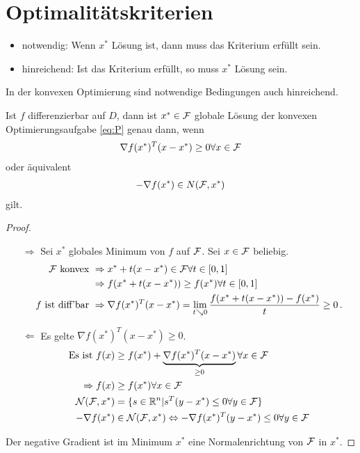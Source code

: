 \section*{Optimalitätskriterien}
\begin{itemize}
\item notwendig: Wenn $x^*$ Lösung ist, dann muss das Kriterium erfüllt sein.
\item hinreichend: Ist das Kriterium erfüllt, so muss $x^*$ Lösung sein.
\end{itemize}
In der konvexen Optimierung sind notwendige Bedingungen auch hinreichend.
\begin{Satz}
\label{opt1}
Ist $f$ differenzierbar auf $D$, dann ist $x^* \in \mathcal{F}$ globale Lösung der konvexen Optimierungsaufgabe \eqref{eq:P} genau dann, wenn
\begin{align*}
\nabla f(x^*)^T(x - x^*) \geq 0  \forall x \in \mathcal{F}
\end{align*}
oder äquivalent
\begin{align*}
-\nabla f(x^*) \in N(\mathcal{F}, x^*)
\end{align*}
gilt.
\end{Satz}
\begin{proof}
\begin{itemize}
\item[$\Rightarrow$] Sei $x^*$ globales Minimum von $f$ auf $\mathcal{F}$. Sei $x\in \mathcal{F}$ beliebig.
\begin{align*}
\mathcal{F} \text{ konvex } &\Rightarrow x^*+t(x-x^*) \in \mathcal{F} \forall t \in [0,1]\\
&\Rightarrow f(x^*+t(x-x^*)) \geq f(x^*) \forall t \in [0,1] \\
f \text{ ist diff'bar } &\Rightarrow \nabla f(x^*)^T(x-x^*)=\lim_{t\searrow 0}\frac{f(x^*+t(x-x^*))-f(x^*)}{t} \geq 0\,.
\end{align*}
\item[$\Leftarrow$] Es gelte $\nabla f(x^*)^T(x - x^*) \geq 0$.
\begin{align*}
\text{Es ist } f(x) &\geq f(x^*)+\underbrace{\nabla f(x^*)^T(x-x^*)}_{\geq 0} \forall x \in \mathcal{F} \\
\Rightarrow f(x) &\geq f(x^*)  \forall x\in \mathcal{F} \\
\mathcal{N}(\mathcal{F}, x^*)&=\lbrace s\in\mathbb R^n | s^T(y-x^*)\leq 0 \forall y\in\mathcal{F} \rbrace \\
-\nabla f(x^*)&\in\mathcal{N}(\mathcal{F},x^*)\Leftrightarrow -\nabla f(x^*)^T(y-x^*)\leq 0 \forall y\in\mathcal{F}
\end{align*}
\end{itemize}
Der negative Gradient ist im Minimum $x^*$ eine Normalenrichtung von $\mathcal{F}$ in $x^*$.
\end{proof}

